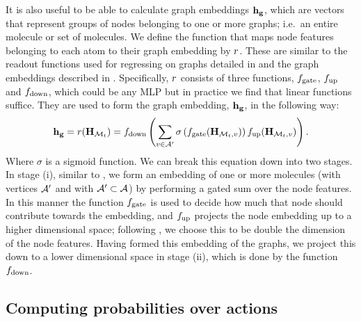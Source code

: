 It is also useful to be able to calculate graph embeddings $\mathbf{h_g}$, which are vectors that represent groups of nodes belonging to one or more graphs; i.e.\ an entire molecule or set of molecules.
 We define the function that maps node features belonging to each atom to their graph embedding by $r$.
These are similar to the readout functions used for regressing on graphs detailed in \citep[Eq. 3]{gilmer2017neural} and the graph embeddings described in \citet[\S B.1]{li2018learning}. 
Specifically, $r$ consists of three functions, $f_\textrm{gate}$, $f_\textrm{up}$ and $f_\textrm{down}$, which could be any MLP but in practice we find that linear functions suffice. %
They are used to form the graph embedding, $\mathbf{h_g}$, in the following way:
\begin{align}
	\mathbf{h_g} = r({\mathbf{H}}_{{\mathcal{M}}_t}) = f_\textrm{down}\left(\sum_{v \in {\mathcal{A}}'} \sigma\left(f_\textrm{gate}({\mathbf{H}}_{{\mathcal{M}}_t,v})\right) f_\textrm{up}({\mathbf{H}}_{{\mathcal{M}}_t, v})\right).
	\label{eq:graph-embedding}
\end{align}
Where $\sigma$ is a sigmoid function.
We can break this equation down into two stages.
In stage (i), similar to \citet[\S B.1]{li2018learning}, we form an embedding of one or more molecules (with vertices ${\mathcal{A}}'$ and with ${\mathcal{A}}' \subset  {\mathcal{A}}$) by performing a gated sum over the node features. 
In this manner the function $f_\textrm{gate}$ is used to decide how much that node should contribute towards the embedding,
 and $f_\textrm{up}$ projects the node embedding up to a higher dimensional space; following \citet[\S B.1]{li2018learning}, we choose this to be double the dimension of the node features.
Having formed this embedding of the graphs, we project this down to a lower dimensional space in stage (ii), which is done by the function $f_\textrm{down}$. 


\subsection{Computing probabilities over actions}


